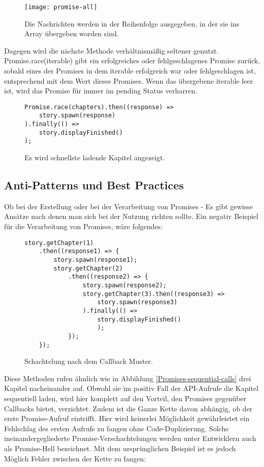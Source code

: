 \begin{figure}[H]
\centering
\texttt{[image: promise-all]}
\caption{Die Nachrichten werden in der Reihenfolge ausgegeben, in der sie ins Array übergeben worden sind.}
\end{figure}

\noindent
Dagegen wird die nächste Methode verhältnismäßig seltener genutzt. Promise.race(iterable) gibt ein erfolgreiches oder fehlgeschlagenes Promise zurück, sobald eines der Promises in dem iterable erfolgreich war oder fehlgeschlagen ist, entsprechend mit dem Wert dieses Promises. Wenn das übergebene iterable leer ist, wird das Promise für immer im pending Status verharren\cite{promise-race}.

\begin{figure}[H]
\begin{lstlisting}[basicstyle=\small]
Promise.race(chapters).then((response) =>
    story.spawn(response)
).finally(() =>
    story.displayFinished()
);
\end{lstlisting}
\caption{Es wird schnellste ladende Kapitel angezeigt.}
\end{figure}

\subsection{Anti-Patterns und Best Practices}

Ob bei der Erstellung oder bei der Verarbeitung von Promises - Es gibt gewisse Ansätze nach denen man sich bei der Nutzung richten sollte. Ein negativ Beispiel für die Verarbeitung von Promises, wäre folgendes:

\begin{figure}[H]
\begin{lstlisting}[basicstyle=\small]
story.getChapter(1)
    .then((response1) => {
        story.spawn(response1);
        story.getChapter(2)
            .then((response2) => {
                story.spawn(response2);
                story.getChapter(3).then((response3) =>
                    story.spawn(response3)
                ).finally(() => 
                    story.displayFinished()
                    );
            });
    });
\end{lstlisting}
\caption{Schachtelung nach dem Callback Muster.}
\end{figure}

\noindent
Diese Methoden rufen ähnlich wie in Abbildung \ref{Promises-sequential-calls} drei Kapitel nacheinander auf. Obwohl sie im positiv Fall der API-Aufrufe die Kapitel sequentiell laden, wird hier komplett auf den Vorteil, den Promises gegenüber Callbacks bietet, verzichtet. Zudem ist die Ganze Kette davon abhängig, ob der erste Promise-Aufruf eintrifft. Hier wird keinerlei Möglichkeit gewährleistet ein Fehlschlag des ersten Aufrufs zu fangen ohne Code-Duplizierung. Solche ineinandergegliederte Promise-Verschachtelungen werden unter Entwicklern auch als \glqq{}Promise-Hell\grqq{} bezeichnet.
Mit dem ursprünglichen Beispiel ist es jedoch Möglich Fehler zwischen der Kette zu fangen:

